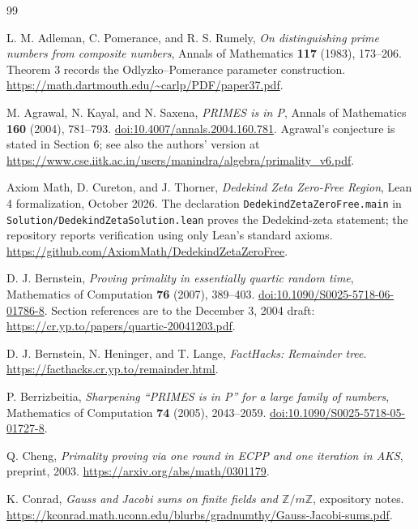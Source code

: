 \documentclass[11pt]{article}
\theoremstyle{definition}
\theoremstyle{remark}
\newcommand{\Z}{\mathbb Z}
\begin{document}
\begingroup\small
\begin{thebibliography}{99}

L. M. Adleman, C. Pomerance, and R. S. Rumely,
\emph{On distinguishing prime numbers from composite numbers},
Annals of Mathematics \textbf{117} (1983), 173--206.
Theorem 3 records the Odlyzko--Pomerance parameter construction.
\url{https://math.dartmouth.edu/~carlp/PDF/paper37.pdf}.

M. Agrawal, N. Kayal, and N. Saxena, \emph{PRIMES is in P},
Annals of Mathematics \textbf{160} (2004), 781--793.
\href{https://doi.org/10.4007/annals.2004.160.781}{doi:10.4007/annals.2004.160.781}.
Agrawal's conjecture is stated in Section 6; see also the authors'
version at
\url{https://www.cse.iitk.ac.in/users/manindra/algebra/primality_v6.pdf}.

Axiom Math, D. Cureton, and J. Thorner,
\emph{Dedekind Zeta Zero-Free Region}, Lean 4 formalization,
October 2026. The declaration \texttt{DedekindZetaZeroFree.main}
in \texttt{Solution/DedekindZetaSolution.lean} proves the
Dedekind-zeta statement; the repository reports verification
using only Lean's standard axioms.
\url{https://github.com/AxiomMath/DedekindZetaZeroFree}.

D. J. Bernstein, \emph{Proving primality in essentially quartic
random time}, Mathematics of Computation \textbf{76} (2007),
389--403.
\href{https://doi.org/10.1090/S0025-5718-06-01786-8}{doi:10.1090/S0025-5718-06-01786-8}.
Section references are to the December 3, 2004 draft:
\url{https://cr.yp.to/papers/quartic-20041203.pdf}.

D. J. Bernstein, N. Heninger, and T. Lange,
\emph{FactHacks: Remainder tree}.
\url{https://facthacks.cr.yp.to/remainder.html}.

P. Berrizbeitia, \emph{Sharpening ``PRIMES is in P'' for a large
family of numbers}, Mathematics of Computation \textbf{74} (2005),
2043--2059.
\href{https://doi.org/10.1090/S0025-5718-05-01727-8}{doi:10.1090/S0025-5718-05-01727-8}.

Q. Cheng, \emph{Primality proving via one round in ECPP and one
iteration in AKS}, preprint, 2003.
\url{https://arxiv.org/abs/math/0301179}.

K. Conrad, \emph{Gauss and Jacobi sums on finite fields and
$\Z/m\Z$}, expository notes.
\url{https://kconrad.math.uconn.edu/blurbs/gradnumthy/Gauss-Jacobi-sums.pdf}.


\end{thebibliography}
\end{document}
